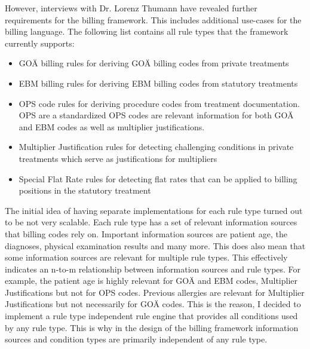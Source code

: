 However, interviews with Dr. Lorenz Thumann have revealed further requirements for the billing framework.
This includes additional use-cases for the billing language.
The following list contains all rule types that the framework currently supports:
\begin{itemize}
    \item GOÄ billing rules for deriving GOÄ billing codes from private treatments
    \item EBM billing rules for deriving EBM billing codes from statutory treatments
    \item OPS code rules for deriving procedure codes from treatment documentation.
    OPS are a standardized
    OPS codes are relevant information for both GOÄ and EBM codes as well as multiplier justifications.
    \item Multiplier Justification rules for detecting challenging conditions in private treatments
    which serve as justifications for multipliers
    \item Special Flat Rate rules
    for detecting flat rates that can be applied to billing positions in the statutory treatment
\end{itemize}


The initial idea of having separate implementations for each rule type turned out to be not very scalable.
Each rule type has a set of relevant information sources that billing codes rely on.
Important information sources are patient age, the diagnoses, physical examination results and many more.
This does also mean that some information sources are relevant for multiple rule types.
This effectively indicates an n-to-m relationship between information sources and rule types.
For example, the patient age is highly relevant for GOÄ and EBM codes, Multiplier Justifications but not for OPS codes.
Previous allergies are relevant for Multiplier Justifications but not necessarily for GOÄ codes.
This is the reason, I decided to implement a rule type independent rule engine that provides all conditions used by any rule type.
This is why in the design of the billing framework information sources and condition types are primarily independent of any rule type.

